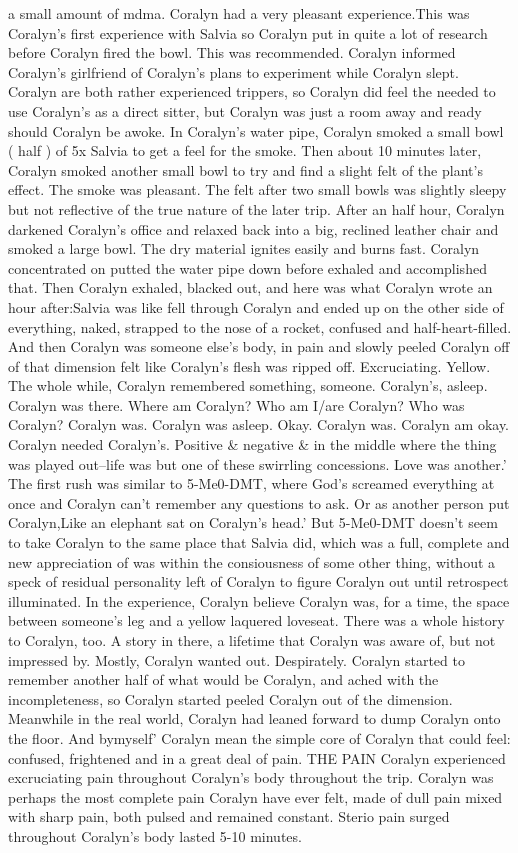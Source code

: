 \documentclass[12pt]{book}
\begin{document}
a small amount of mdma. Coralyn had a very pleasant experience.This was Coralyn's first experience with Salvia so Coralyn put in quite a lot of research before Coralyn fired the bowl. This was recommended. Coralyn informed Coralyn's girlfriend of Coralyn's plans to experiment while Coralyn slept. Coralyn are both rather experienced trippers, so Coralyn did feel the needed to use Coralyn's as a direct sitter, but Coralyn was just a room away and ready should Coralyn be awoke. In Coralyn's water pipe, Coralyn smoked a small bowl ( half ) of 5x Salvia to get a feel for the smoke. Then about 10 minutes later, Coralyn smoked another small bowl to try and find a slight felt of the plant's effect. The smoke was pleasant. The felt after two small bowls was slightly sleepy but not reflective of the true nature of the later trip. After an half hour, Coralyn darkened Coralyn's office and relaxed back into a big, reclined leather chair and smoked a large bowl. The dry material ignites easily and burns fast. Coralyn concentrated on putted the water pipe down before exhaled and accomplished that. Then Coralyn exhaled, blacked out, and here was what Coralyn wrote an hour after:Salvia was like fell through Coralyn and ended up on the other side of everything, naked, strapped to the nose of a rocket, confused and half-heart-filled. And then Coralyn was someone else's body, in pain and slowly peeled Coralyn off of that dimension felt like Coralyn's flesh was ripped off. Excruciating. Yellow. The whole while, Coralyn remembered something, someone. Coralyn's, asleep. Coralyn was there. Where am Coralyn? Who am I/are Coralyn? Who was Coralyn? Coralyn was. Coralyn was asleep. Okay. Coralyn was. Coralyn am okay. Coralyn needed Coralyn's. Positive \& negative \& in the middle where the thing was played out--life was but one of these swirrling concessions. Love was another.' The first rush was similar to 5-Me0-DMT, where God's screamed everything at once and Coralyn can't remember any questions to ask. Or as another person put Coralyn,Like an elephant sat on Coralyn's head.' But 5-Me0-DMT doesn't seem to take Coralyn to the same place that Salvia did, which was a full, complete and new appreciation of was within the consiousness of some other thing, without a speck of residual personality left of Coralyn to figure Coralyn out until retrospect illuminated. In the experience, Coralyn believe Coralyn was, for a time, the space between someone's leg and a yellow laquered loveseat. There was a whole history to Coralyn, too. A story in there, a lifetime that Coralyn was aware of, but not impressed by. Mostly, Coralyn wanted out. Despirately. Coralyn started to remember another half of what would be Coralyn, and ached with the incompleteness, so Coralyn started peeled Coralyn out of the dimension. Meanwhile in the real world, Coralyn had leaned forward to dump Coralyn onto the floor. And bymyself' Coralyn mean the simple core of Coralyn that could feel: confused, frightened and in a great deal of pain. THE PAIN Coralyn experienced excruciating pain throughout Coralyn's body throughout the trip. Coralyn was perhaps the most complete pain Coralyn have ever felt, made of dull pain mixed with sharp pain, both pulsed and remained constant. Sterio pain surged throughout Coralyn's body lasted 5-10 minutes. 
\end{document}
